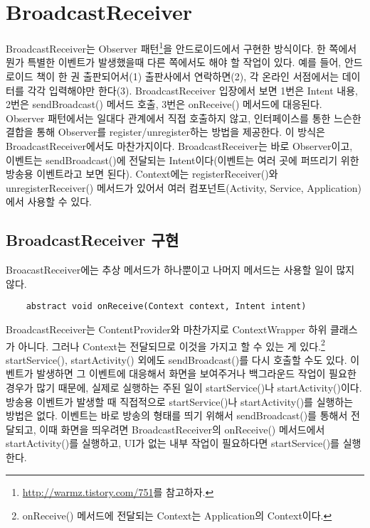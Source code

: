 \chapter{BroadcastReceiver}
BroadcastReceiver는 Observer 패턴\footnote{\url{http://warmz.tistory.com/751}를 참고하자.}을 안드로이드에서 구현한 방식이다.
한 쪽에서 뭔가 특별한 이벤트가 발생했을때 다른 쪽에서도 해야 할 작업이 있다.
예를 들어, 안드로이드 책이 한 권 출판되어서(1) 출판사에서 연락하면(2), 각 온라인 서점에서는 데이터를 각각 입력해야만 한다(3). BroadcastReceiver 입장에서 보면 1번은 Intent 내용, 2번은 sendBroadcast() 메서드 호출, 3번은 onReceive() 메서드에 대응된다.\\

Observer 패턴에서는 일대다 관계에서 직접 호출하지 않고, 인터페이스를 통한 느슨한 결합을 통해 Observer를 register/unregister하는 방법을 제공한다.
이 방식은 BroadcastReceiver에서도 마찬가지이다. BroadcastReceiver는 바로 Observer이고, 이벤트는 sendBroadcast()에 전달되는 Intent이다(이벤트는 여러 곳에 퍼뜨리기 위한 방송용 이벤트라고 보면 된다). Context에는 registerReceiver()와 unregisterReceiver() 메서드가 있어서 여러 컴포넌트(Activity, Service, Application)에서 사용할 수 있다.

\section{BroadcastReceiver 구현}
BroacastReceiver에는 추상 메서드가 하나뿐이고 나머지 메서드는 사용할 일이 많지 않다.
\begin{verbatim}
	abstract void onReceive(Context context, Intent intent)
\end{verbatim}

BroadcastReceiver는 ContentProvider와 마찬가지로 ContextWrapper 하위 클래스가 아니다. 그러나 Context는 전달되므로 이것을 가지고 할 수 있는 게 있다.\footnote{onReceive() 메서드에 전달되는 Context는 Application의 Context이다.}
startService(), startActivity() 외에도 sendBroadcast()를 다시 호출할 수도 있다. 
이벤트가 발생하면 그 이벤트에 대응해서 화면을 보여주거나 백그라운드 작업이 필요한 경우가 많기 때문에, 실제로 실행하는 주된 일이 startService()나 startActivity()이다. \\

방송용 이벤트가 발생할 때 직접적으로 startService()나 startActivity()를 실행하는 방법은 없다. 이벤트는 바로 방송의 형태를 띄기 위해서 sendBroadcast()를 통해서 전달되고, 이때 화면을 띄우려면 BroadcastReceiver의 onReceive() 메서드에서 startActivity()를 실행하고, UI가 없는 내부 작업이 필요하다면 startService()를 실행한다.\\

